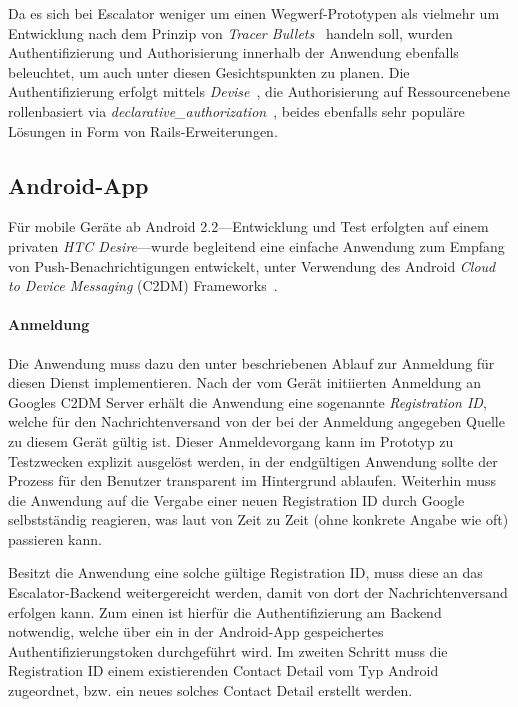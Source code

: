 \documentclass[11pt,utf8,notoc,bibnum,german,final]{zihpub}
\begin{document}
Da es sich bei Escalator weniger um einen Wegwerf-Prototypen als vielmehr um
Entwicklung nach dem Prinzip von \emph{Tracer Bullets}~\cite{tracerbullets}
handeln soll, wurden Authentifizierung und Authorisierung innerhalb der
Anwendung ebenfalls beleuchtet, um auch unter diesen Gesichtspunkten zu planen.
Die Authentifizierung erfolgt mittels \emph{Devise}~\cite{devise}, die
Authorisierung auf Ressourcenebene rollenbasiert via
\emph{declarative\_authorization}~\cite{declarative-authorization}, beides
ebenfalls sehr populäre Lösungen in Form von Rails-Erweiterungen.


\subsection{Android-App}

Für mobile Geräte ab Android 2.2—Entwicklung und Test erfolgten auf einem
privaten \emph{HTC Desire}—wurde begleitend eine einfache Anwendung zum Empfang
von Push-Benachrichtigungen entwickelt, unter Verwendung des Android
\emph{Cloud to Device Messaging} (C2DM) Frameworks~\cite{c2dm}.

\paragraph{Anmeldung}

Die Anwendung muss dazu den unter \cite{c2dm-lifecycle} beschriebenen Ablauf
zur Anmeldung für diesen Dienst implementieren. Nach der vom Gerät initiierten
Anmeldung an Googles C2DM Server erhält die Anwendung eine sogenannte
\emph{Registration ID}, welche für den Nachrichtenversand von der bei der
Anmeldung angegeben Quelle zu diesem Gerät gültig ist. Dieser Anmeldevorgang
kann im Prototyp zu Testzwecken explizit ausgelöst werden, in der endgültigen
Anwendung sollte der Prozess für den Benutzer transparent im Hintergrund
ablaufen. Weiterhin muss die Anwendung auf die Vergabe einer neuen Registration
ID durch Google selbstständig reagieren, was laut \cite{c2dm-lifecycle} von
Zeit zu Zeit (ohne konkrete Angabe wie oft) passieren kann.

Besitzt die Anwendung eine solche gültige Registration ID, muss diese an das
Escalator-Backend weitergereicht werden, damit von dort der Nachrichtenversand
erfolgen kann. Zum einen ist hierfür die Authentifizierung am Backend
notwendig, welche über ein in der Android-App gespeichertes
Authentifizierungstoken durchgeführt wird. Im zweiten Schritt muss die
Registration ID einem existierenden Contact Detail vom Typ Android zugeordnet,
bzw. ein neues solches Contact Detail erstellt werden.
\end{document}
